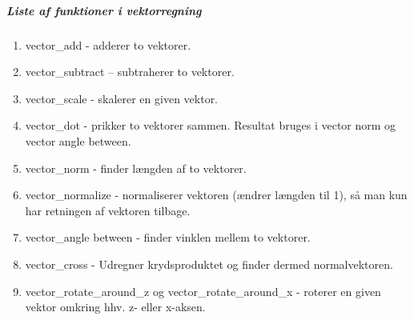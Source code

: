\subparagraph{Liste af funktioner i vektorregning}
\begin{enumerate}

  \item vector\_add - adderer to vektorer.
  \item vector\_subtract – subtraherer to vektorer.
  \item vector\_scale - skalerer en given vektor.
  \item vector\_dot - prikker to vektorer sammen. Resultat bruges i vector norm og vector angle between.
  \item vector\_norm - finder længden af to vektorer.
  \item vector\_normalize - normaliserer vektoren (ændrer længden til 1), så man kun har retningen af vektoren tilbage.
  \item vector\_angle between - finder vinklen mellem to vektorer.
  \item vector\_cross - Udregner krydsproduktet og finder dermed normalvektoren.
  \item vector\_rotate\_around\_z og vector\_rotate\_around\_x - roterer en given vektor omkring hhv. z- eller x-aksen.

\end{enumerate}